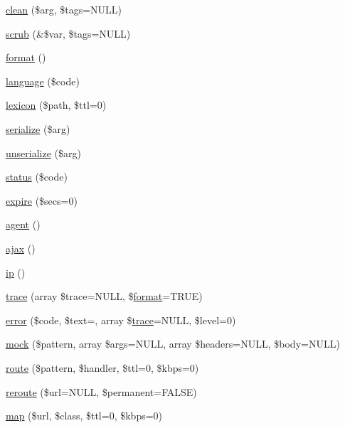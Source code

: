 \begin{DoxyCompactItemize}
\item 
\hyperlink{class_base_aaaeb3a6da8c7c370705a33e599c3144a}{clean} (\$arg, \$tags=N\+U\+LL)
\item 
\hyperlink{class_base_aa5b63d859ddc3953cc72877b834beb53}{scrub} (\&\$var, \$tags=N\+U\+LL)
\item 
\hyperlink{class_base_afe083716d50b3fb4057e519961b9235c}{format} ()
\item 
\hyperlink{class_base_aeff6ba9b2402e9a6e39c424452f8ffb1}{language} (\$code)
\item 
\hyperlink{class_base_a084dcc9ed975d967d44aeafc628db4da}{lexicon} (\$path, \$ttl=0)
\item 
\hyperlink{class_base_a8f26410af8419317fe83d822e12c18f0}{serialize} (\$arg)
\item 
\hyperlink{class_base_ad07703b75ad394aac9592c2f7684f87e}{unserialize} (\$arg)
\item 
\hyperlink{class_base_a4505aab5ca6dd00d047da06786883df2}{status} (\$code)
\item 
\hyperlink{class_base_a11de9ffc2348b9090fbcd40fe00259ab}{expire} (\$secs=0)
\item 
\hyperlink{class_base_a77f6a261d70e66c7b7273774832482dc}{agent} ()
\item 
\hyperlink{class_base_a73a8e42630137b1b11246d16d7cd23d5}{ajax} ()
\item 
\hyperlink{class_base_a197bae3714812901860bd006b00f91de}{ip} ()
\item 
\hyperlink{class_base_a83230924155c911fd8db8f0619ced19a}{trace} (array \$trace=N\+U\+LL, \$\hyperlink{class_base_afe083716d50b3fb4057e519961b9235c}{format}=T\+R\+UE)
\item 
\hyperlink{class_base_aa73cf9e2c791864c9baf4c2d55b5f68b}{error} (\$code, \$text=\textquotesingle{}\textquotesingle{}, array \$\hyperlink{class_base_a83230924155c911fd8db8f0619ced19a}{trace}=N\+U\+LL, \$level=0)
\item 
\hyperlink{class_base_a37955584341e20d695a2dea982e3e192}{mock} (\$pattern, array \$args=N\+U\+LL, array \$headers=N\+U\+LL, \$body=N\+U\+LL)
\item 
\hyperlink{class_base_a369026a3cb8f321eadc19535ee308b2d}{route} (\$pattern, \$handler, \$ttl=0, \$kbps=0)
\item 
\hyperlink{class_base_a5a8efc7bc5d742984142bbcd2266128d}{reroute} (\$url=N\+U\+LL, \$permanent=F\+A\+L\+SE)
\item 
\hyperlink{class_base_ad64de620e7d21824d5f36dad0fb75945}{map} (\$url, \$class, \$ttl=0, \$kbps=0)
\item 

\end{DoxyCompactItemize}
